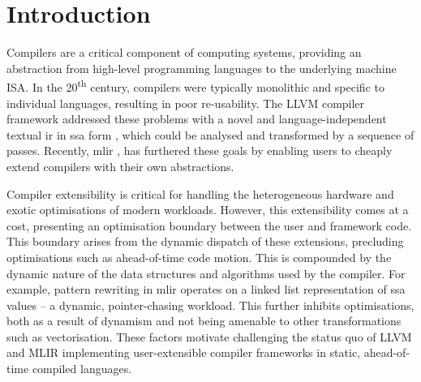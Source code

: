 \chapter{Introduction}
\label{chap:introduction}




Compilers are a critical component of computing systems, providing an abstraction from high-level programming languages to the underlying machine ISA.
In the 20\textsuperscript{th} century, compilers were typically monolithic and specific to individual languages, resulting in poor re-usability.
The LLVM compiler framework \cite{lattnerLLVMCompilationFramework2004} addressed these problems with a novel and language-independent textual \ac{ir} in \ac{ssa} form \cite{cytronEfficientlyComputingStatic1991}, which could be analysed and transformed by a sequence of passes.
Recently, \ac{mlir} \cite{lattnerMLIRScalingCompiler2021a}, has furthered these goals by enabling users to cheaply extend compilers with their own abstractions. %





Compiler extensibility is critical for handling the heterogeneous hardware and exotic optimisations of modern workloads.
However, this extensibility comes at a cost, presenting an optimisation boundary between the user and framework code. This boundary arises from the dynamic dispatch of these extensions, precluding optimisations such as ahead-of-time code motion.
This is compounded by the dynamic nature of the data structures and algorithms used by the compiler. For example, pattern rewriting in \ac{mlir} operates on a linked list representation of \ac{ssa} values -- a dynamic, pointer-chasing workload.
This further inhibits optimisations, both as a result of dynamism and not being amenable to other transformations such as vectorisation.
These factors motivate challenging the status quo of LLVM and MLIR implementing user-extensible compiler frameworks in static, ahead-of-time compiled languages.






